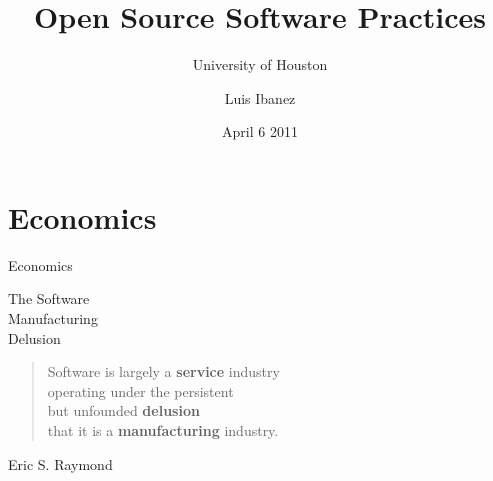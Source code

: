 \documentclass[18pt]{beamer}
\begin{document}
\title[Open Source]{Open Source Software Practices}
\subtitle[UH]{University of Houston}
\author[Luis Ibanez]{Luis Ibanez}
\date[April 2011]{April 6 2011}

\begin{frame}
\titlepage
\end{frame}

\begin{frame}
  \tableofcontents
\end{frame}


\section{Economics}

{
\begin{frame}[plain]
\fontsize{72pt}{90pt}\selectfont
\center
\begin{center}
Economics
\end{center}
\end{frame}
}

{
\color{white}
\begin{frame}[plain]
\fontsize{36pt}{36pt}\selectfont
\center
\begin{center}
The Software\\
Manufacturing\\
Delusion
\end{center}
\end{frame}
}

\begin{frame}[plain]
\fontsize{18pt}{18pt}\selectfont
\center
\begin{quote}
Software is largely a \textbf{service} industry\\
operating under the persistent\\
but unfounded \textbf{delusion}\\
that it is a \textbf{manufacturing} industry.\\
\end{quote}
\bigskip
\begin{flushright}
Eric S. Raymond
\end{flushright}
\end{frame}
\end{document}
